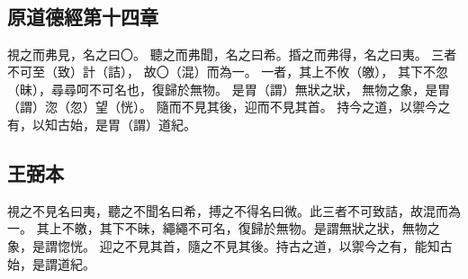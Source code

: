 ﻿%
%

\chapter{~}

\section{原道德經第十四章}

\begin{withgezhu}

\zhsong


視之而弗見，\colorbox{missing-color}{名}之曰〇。
聽之而弗聞，名之曰希。捪之而弗得，名之曰夷。
三者不可至（\textcolor{tongjia-color}{致}）計（\textcolor{tongjia-color}{詰}），
故〇（\textcolor{tongjia-color}{混}）\colorbox{adding-color}{而為一}。
一者，其上不攸（\textcolor{tongjia-color}{皦}），
其下不忽（\textcolor{tongjia-color}{昧}），尋尋呵不可名也，復歸於無物。
是胃（\textcolor{tongjia-color}{謂}）無狀之狀，
無物之\colorbox{adding-color}{象，是胃（\textcolor{tongjia-color}{謂}）淴（\textcolor{tongjia-color}{忽}）望（\textcolor{tongjia-color}{恍}）}。
\colorbox{adding-color}{隨而不見其後，迎}而不見其首。
持今之道，以禦今之有，以知古始，是胃（\textcolor{tongjia-color}{謂}）道紀。

\end{withgezhu}

\section{王弼本}

\begin{withgezhu}

\zhsong

視之不見名曰夷，聽之不聞名曰希，搏之不得名曰微。此三者不可致詰，故混而為一。
其上不皦，其下不昧，繩繩不可名，復歸於無物。是謂無狀之狀，無物之象，是謂惚恍。
迎之不見其首，隨之不見其後。持古之道，以禦今之有，能知古始，是謂道紀。

\end{withgezhu}
